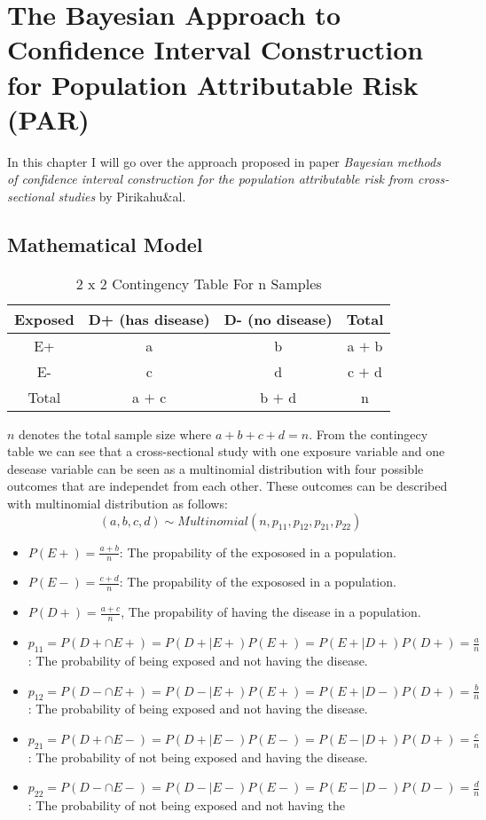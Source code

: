 \chapter{The Bayesian Approach to Confidence Interval Construction for Population Attributable Risk (PAR)} \label{bayesian-model}
In this chapter I will go over the approach proposed in paper \textit{Bayesian methods of confidence interval construction for the population attributable risk from cross-sectional studies} by Pirikahu\&al. 

\section{Mathematical Model} \label{PiriMath}
\begin{table}[h!]
\centering
\caption{2 x 2 Contingency Table For n Samples}
\label{contingency-table}
\begin{tabular}{|c|c|c|c|}
\hline
Exposed & D+ (has disease) & D- (no disease) & Total \\ \hline
E+ & a & b & a $+$ b \\ \hline
E- & c & d & c $+$ d \\ \hline
Total & a $+$ c & b $+$ d & n \\ \hline
\end{tabular}
\end{table}

$n$ denotes the total sample size where $a + b + c + d = n$. From the contingecy table we can see that a cross-sectional study with one exposure variable and one desease variable can be seen as a multinomial distribution with four possible outcomes that are independet from each other. These outcomes can be described with multinomial distribution as follows:
\begin{equation} \label{multinomial}
(a, b, c, d) \sim Multinomial(n, p_{11}, p_{12}, p_{21}, p_{22})
\end{equation}

\begin{itemize}
    \item $P(E+) = \frac{a + b}{n}$: The propability of the expososed in a population.
    \item $P(E-) = \frac{c + d}{n}$: The propability of the expososed in a population.
    \item $P(D+) = \frac{a + c}{n}$, The propability of having the disease in a population.
    \item $p_{11} = P(D + \cap E+) = P(D + | E+)P(E+) = P(E + | D+)P(D+) = \frac{a}{n}$: The probability of being exposed and not having the disease.
    \item $p_{12} = P(D - \cap E+) = P(D - | E+)P(E+) = P(E + | D-)P(D+) = \frac{b}{n}$: The probability of being exposed and not having the disease.
    \item $p_{21} = P(D + \cap E-) = P(D + | E-)P(E-) = P(E - | D+)P(D+) = \frac{c}{n}$: The probability of not being exposed and having the disease.
    \item $p_{22} = P(D - \cap E-) = P(D - | E-)P(E-) = P(E - | D-)P(D-) = \frac{d}{n}$: The probability of not being exposed and not having the
\end{itemize}

